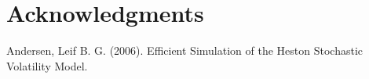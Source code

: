 \documentclass{ws-ijfe}
\begin{document}
\section*{Acknowledgments}

\begin{thebibliography}{99}
Andersen, Leif B. G. (2006). Efficient Simulation of the Heston Stochastic Volatility Model.




\end{thebibliography}
\end{document}
